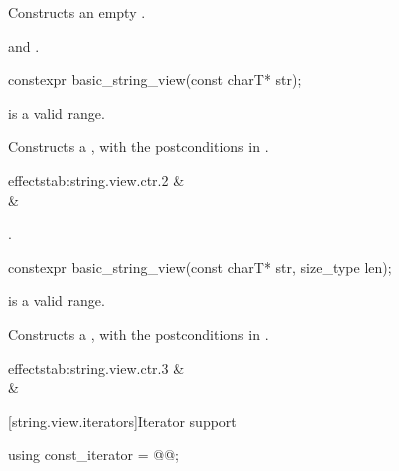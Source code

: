 \begin{itemdescr}
\pnum
\effects
Constructs an empty .

\pnum
\ensures
{} and .
\end{itemdescr}

%
\begin{itemdecl}
constexpr basic_string_view(const charT* str);
\end{itemdecl}

\begin{itemdescr}
\pnum
\requires
{} is a valid range.

\pnum
\effects
Constructs a , with the postconditions
in .
\begin{libefftabvaluenarrow}{ effects}{tab:string.view.ctr.2}
 &  \\
 &  \\
\end{libefftabvaluenarrow}

\pnum
\complexity
{}.
\end{itemdescr}

%
\begin{itemdecl}
constexpr basic_string_view(const charT* str, size_type len);
\end{itemdecl}

\begin{itemdescr}
\pnum
\requires
{} is a valid range.

\pnum
\effects
Constructs a , with the postconditions in .
\begin{libefftabvaluenarrow}{ effects}{tab:string.view.ctr.3}
 &  \\
 &  \\
\end{libefftabvaluenarrow}
\end{itemdescr}

[string.view.iterators]{Iterator support}

%
\begin{itemdecl}
using const_iterator = @@;
\end{itemdecl}

